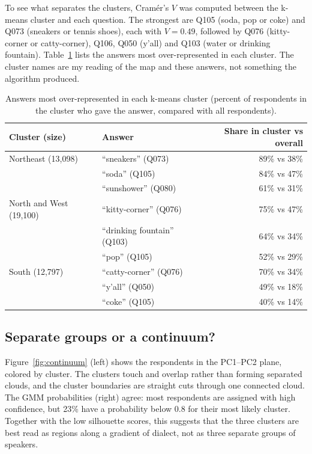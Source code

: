 \documentclass[10pt,letterpaper]{article}
\begin{document}
To see what separates the clusters, Cram\'er's $V$ was computed between the k-means cluster and each question. The strongest are Q105 (soda, pop or coke) and Q073 (sneakers or tennis shoes), each with $V = 0.49$, followed by Q076 (kitty-corner or catty-corner), Q106, Q050 (y'all) and Q103 (water or drinking fountain). Table~\ref{tab:clusters} lists the answers most over-represented in each cluster. The cluster names are my reading of the map and these answers, not something the algorithm produced.

\begin{table}[h]
\centering
\small
\begin{tabular}{llr}
\hline
Cluster (size) & Answer & Share in cluster vs overall \\
\hline
Northeast (13,098) & ``sneakers'' (Q073) & 89\% vs 38\% \\
 & ``soda'' (Q105) & 84\% vs 47\% \\
 & ``sunshower'' (Q080) & 61\% vs 31\% \\
North and West (19,100) & ``kitty-corner'' (Q076) & 75\% vs 47\% \\
 & ``drinking fountain'' (Q103) & 64\% vs 34\% \\
 & ``pop'' (Q105) & 52\% vs 29\% \\
South (12,797) & ``catty-corner'' (Q076) & 70\% vs 34\% \\
 & ``y'all'' (Q050) & 49\% vs 18\% \\
 & ``coke'' (Q105) & 40\% vs 14\% \\
\hline
\end{tabular}
\caption{Answers most over-represented in each k-means cluster (percent of respondents in the cluster who gave the answer, compared with all respondents).}
\label{tab:clusters}
\end{table}

\subsection{Separate groups or a continuum?}

Figure~\ref{fig:continuum} (left) shows the respondents in the PC1--PC2 plane, colored by cluster. The clusters touch and overlap rather than forming separated clouds, and the cluster boundaries are straight cuts through one connected cloud. The GMM probabilities (right) agree: most respondents are assigned with high confidence, but 23\% have a probability below 0.8 for their most likely cluster. Together with the low silhouette scores, this suggests that the three clusters are best read as regions along a gradient of dialect, not as three separate groups of speakers.
\end{document}
